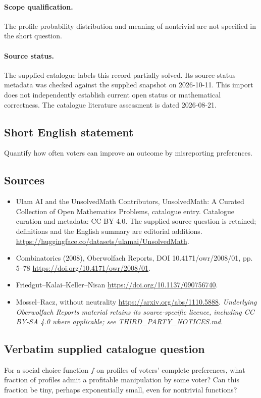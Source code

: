 \documentclass[11pt]{article}
\begin{document}
\paragraph{Scope qualification.}
The profile probability distribution and meaning of nontrivial are not specified in the short question.
\paragraph{Source status.}
The supplied catalogue labels this record partially solved. Its source-status metadata was checked against the supplied snapshot on 2026-10-11. This import does not independently establish current open status or mathematical correctness. The catalogue literature assessment is dated 2026-08-21.
\subsection{Short English statement}
Quantify how often voters can improve an outcome by misreporting preferences.
\subsection{Sources}
\begin{itemize}
\item[S1] Ulam AI and the UnsolvedMath Contributors, UnsolvedMath: A Curated Collection of Open Mathematics Problems, catalogue entry. Catalogue curation and metadata: CC BY 4.0. The supplied source question is retained; definitions and the English summary are editorial additions.
\url{https://huggingface.co/datasets/ulamai/UnsolvedMath}.
\item[S2] Combinatorics (2008), Oberwolfach Reports, DOI 10.4171/owr/2008/01, pp. 5--78
\url{https://doi.org/10.4171/owr/2008/01}.
\item[S3] Friedgut--Kalai--Keller--Nisan
\url{https://doi.org/10.1137/090756740}.
\item[S4] Mossel--Racz, without neutrality
\url{https://arxiv.org/abs/1110.5888}.
\textit{Underlying Oberwolfach Reports material retains its source-specific licence, including CC BY-SA 4.0 where applicable; see THIRD\_PARTY\_NOTICES.md.}
\end{itemize}
\subsection{Verbatim supplied catalogue question}
For a social choice function $f$ on profiles of voters' complete preferences, what fraction of profiles admit a profitable manipulation by some voter? Can this fraction be tiny, perhaps exponentially small, even for nontrivial functions?
\end{document}
